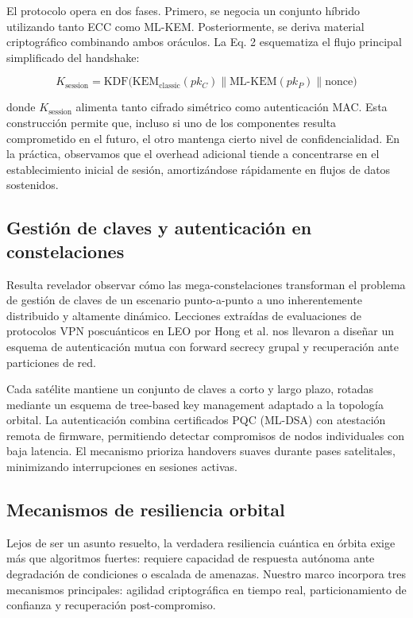 El protocolo opera en dos fases. Primero, se negocia un conjunto híbrido utilizando tanto ECC como ML-KEM. Posteriormente, se deriva material criptográfico combinando ambos oráculos. La Eq. 2 esquematiza el flujo principal simplificado del handshake:

\begin{equation}
K_{\text{session}} = \text{KDF}\Big( \text{KEM}_{\text{classic}}(pk_C) \parallel \text{ML-KEM}(pk_P) \parallel \text{nonce} \Big)
\label{eq:handshake_pqc}
\end{equation}

donde \(K_{\text{session}}\) alimenta tanto cifrado simétrico como autenticación MAC. Esta construcción permite que, incluso si uno de los componentes resulta comprometido en el futuro, el otro mantenga cierto nivel de confidencialidad. En la práctica, observamos que el overhead adicional tiende a concentrarse en el establecimiento inicial de sesión, amortizándose rápidamente en flujos de datos sostenidos.

\subsection{Gestión de claves y autenticación en constelaciones}

Resulta revelador observar cómo las mega-constelaciones transforman el problema de gestión de claves de un escenario punto-a-punto a uno inherentemente distribuido y altamente dinámico. Lecciones extraídas de evaluaciones de protocolos VPN poscuánticos en LEO por Hong et al. \cite{Hong2026} nos llevaron a diseñar un esquema de autenticación mutua con forward secrecy grupal y recuperación ante particiones de red.

Cada satélite mantiene un conjunto de claves a corto y largo plazo, rotadas mediante un esquema de tree-based key management adaptado a la topología orbital. La autenticación combina certificados PQC (ML-DSA) con atestación remota de firmware, permitiendo detectar compromisos de nodos individuales con baja latencia. El mecanismo prioriza handovers suaves durante pases satelitales, minimizando interrupciones en sesiones activas.

\subsection{Mecanismos de resiliencia orbital}

Lejos de ser un asunto resuelto, la verdadera resiliencia cuántica en órbita exige más que algoritmos fuertes: requiere capacidad de respuesta autónoma ante degradación de condiciones o escalada de amenazas. Nuestro marco incorpora tres mecanismos principales: agilidad criptográfica en tiempo real, particionamiento de confianza y recuperación post-compromiso.

